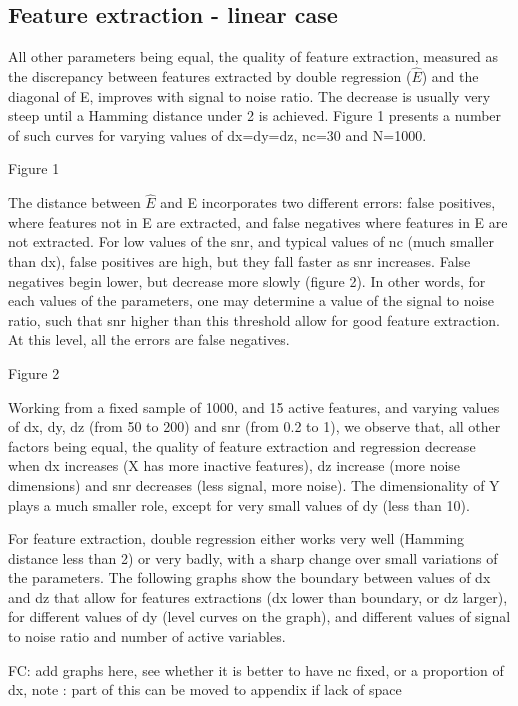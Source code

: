 \documentclass{article}
\begin{document}
\subsection{Feature extraction - linear case}
All other parameters being equal, the quality of feature extraction, measured as the discrepancy between features extracted by double regression ($\hat E$) and the diagonal of E, improves with signal to noise ratio.
%
The decrease is usually very steep until a Hamming distance under 2 is achieved.
%
Figure 1 presents a number of such curves for varying values of dx=dy=dz, nc=30 and N=1000.

Figure 1

The distance between $\hat E$ and E incorporates two different errors: false positives, where features not in E are extracted, and false negatives where features in E are not extracted.
%
For low values of the snr, and typical values of nc (much smaller than dx), false positives are high, but they fall faster as snr increases.
%
False negatives begin lower, but decrease more slowly (figure 2).
%
In other words, for each values of the parameters, one may determine a value of the signal to noise ratio, such that snr higher than this threshold allow for good feature extraction.
%
At this level, all the errors are false negatives.

Figure 2

Working from a fixed sample of 1000, and 15 active features, and varying values of dx, dy, dz (from 50 to 200) and snr (from 0.2 to 1), we observe that, all other factors being equal, the quality of feature extraction and regression decrease when dx increases (X has more inactive features), dz increase (more noise dimensions) and snr decreases (less signal, more noise).
%
The dimensionality of Y plays a much smaller role, except for very small values of dy (less than 10).

For feature extraction, double regression either works very well (Hamming distance less than 2) or very badly, with a sharp change over small variations of the parameters.
%
The following graphs show the boundary between values of dx and dz that allow for features extractions (dx lower than boundary, or dz larger), for different values of dy (level curves on the graph), and different values of signal to noise ratio and number of active variables.

FC: add graphs here, see whether it is better to have nc fixed, or a proportion of dx, note : part of this can be moved to appendix if lack of space
\end{document}
